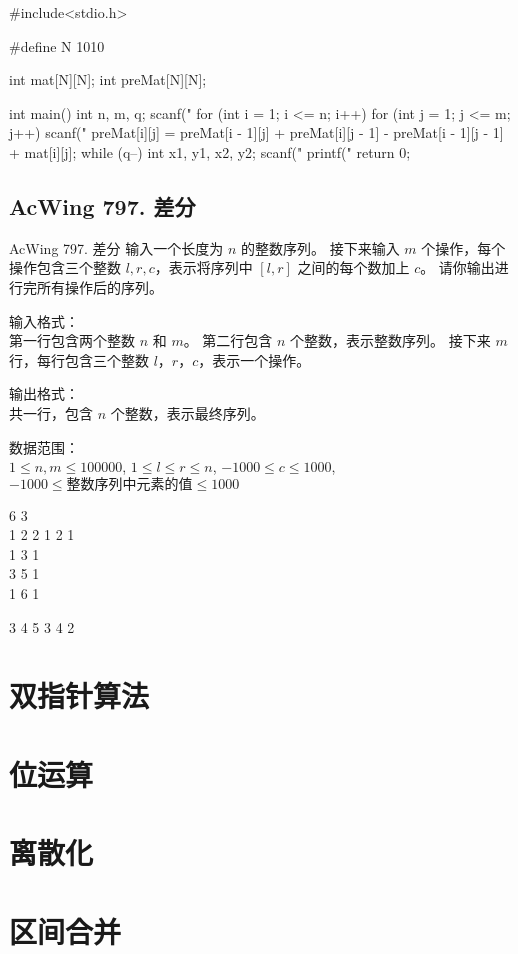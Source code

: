 \begin{mycpponecol}[子矩阵的和]
#include<stdio.h>

#define N 1010

int mat[N][N];
int preMat[N][N];

int main()
{
    int n, m, q;
    scanf("%
    for (int i = 1; i <= n; i++) {
        for (int j = 1; j <= m; j++) {
            scanf("%
            preMat[i][j] = preMat[i - 1][j] + preMat[i][j - 1] - preMat[i - 1][j - 1] + mat[i][j];
        }
    }
    while (q--) {
        int x1, y1, x2, y2;
        scanf("%
        printf("%
    }
    return 0;
}
\end{mycpponecol}

\subsection{AcWing 797. 差分}
\begin{titledbox}{AcWing 797. 差分}
    输入一个长度为 $n$ 的整数序列。
    接下来输入 $m$ 个操作，每个操作包含三个整数 $l, r, c$，表示将序列中 $[l, r]$ 之间的每个数加上 $c$。
    请你输出进行完所有操作后的序列。

    输入格式：\\
    第一行包含两个整数 $n$ 和 $m$。
    第二行包含 $n$ 个整数，表示整数序列。
    接下来 $m$ 行，每行包含三个整数 $l，r，c$，表示一个操作。
    
    输出格式：\\
    共一行，包含 $n$ 个整数，表示最终序列。
    
    数据范围：\\
    $1 \le n,m \le 100000$,
    $1 \le l \le r \le n$,
    $-1000 \le c \le 1000$,
    $-1000 \le \text{整数序列中元素的值} \le 1000$
    
    \begin{inputblock}
        6 3 \\
        1 2 2 1 2 1 \\
        1 3 1 \\
        3 5 1 \\
        1 6 1 \\
    \end{inputblock}
    \begin{outputblock}
        3 4 5 3 4 2
    \end{outputblock}
\end{titledbox}
\section{双指针算法}


\section{位运算}


\section{离散化}


\section{区间合并}